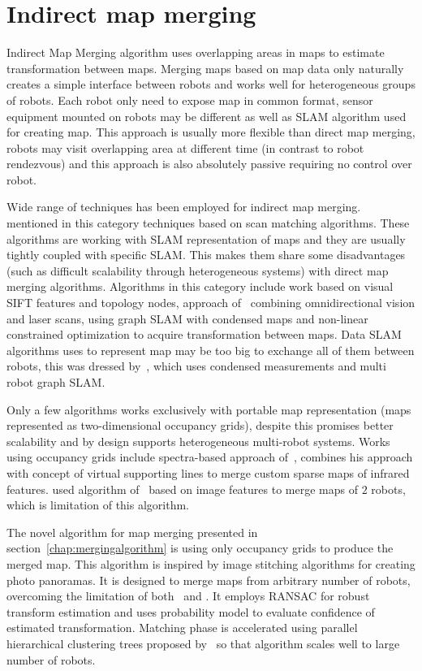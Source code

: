 \section{Indirect map merging}

Indirect Map Merging algorithm uses overlapping areas in maps to estimate transformation between maps. Merging maps based on map data only naturally creates a simple interface between robots and works well for heterogeneous groups of robots. Each robot only need to expose map in common format, sensor equipment mounted on robots may be different as well as \gls{SLAM} algorithm used for creating map. This approach is usually more flexible than direct map merging, robots may visit overlapping area at different time (in contrast to robot rendezvous) and this approach is also absolutely passive requiring no control over robot.

Wide range of techniques has been employed for indirect map merging. \cite{Lee2012} mentioned in this category techniques based on scan matching algorithms. These algorithms are working with \gls{SLAM} representation of maps and they are usually tightly coupled with specific \gls{SLAM}. This makes them share some disadvantages (such as difficult scalability through heterogeneous systems) with direct map merging algorithms. Algorithms in this category include \cite{Wang2012} work based on visual \gls{SIFT} features and topology nodes, approach of~\cite{Tungandi2010} combining omnidirectional vision and laser scans, \cite{Cunningham2012} using graph \gls{SLAM} with condensed maps and non-linear constrained optimization to acquire transformation between maps. Data \gls{SLAM} algorithms uses to represent map may be too big to exchange all of them between robots, this was dressed by~\cite{Lazaro2013}, which uses condensed measurements and multi robot graph \gls{SLAM}.

Only a few algorithms works exclusively with portable map representation (maps represented as two-dimensional occupancy grids), despite this promises better scalability and by design supports heterogeneous multi-robot systems. Works using occupancy grids include spectra-based approach of~\cite{Carpin2008}, \cite{Lee2011} combines his approach with concept of virtual supporting lines to merge custom sparse maps of infrared features. \cite{martins2013mrslam} used algorithm of~\cite{MapstitchROS} based on image features to merge maps of $2$ robots, which is limitation of this algorithm.

The novel algorithm for map merging presented in section~\ref{chap:mergingalgorithm} is using only occupancy grids to produce the merged map. This algorithm is inspired by image stitching algorithms for creating photo panoramas. It is designed to merge maps from arbitrary number of robots, overcoming the limitation of both~\cite{MapstitchROS} and \cite{Carpin2008}. It employs \gls{RANSAC} for robust transform estimation and uses probability model to evaluate confidence of estimated transformation. Matching phase is accelerated using parallel hierarchical clustering trees proposed by~\cite{Muja2012} so that algorithm scales well to large number of robots.

